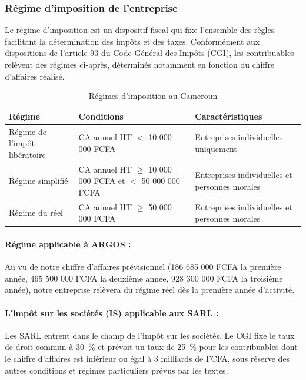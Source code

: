 \subsubsection{Régime d'imposition de l'entreprise}

Le régime d'imposition est un dispositif fiscal qui fixe l'ensemble des règles facilitant la détermination des impôts et des taxes. Conformément aux dispositions de l'article 93 du Code Général des Impôts (CGI), les contribuables relèvent des régimes ci-après, déterminés notamment en fonction du chiffre d'affaires réalisé\cite{cgi_cameroun}.

\begin{table}[htbp]
    \centering
    \caption{Régimes d'imposition au Cameroun}
    \label{tab:regimes_imposition}
    \renewcommand{\arraystretch}{1.5}
    \begin{tabularx}{\textwidth}{|>{\raggedright\arraybackslash}p{4cm}|>{\raggedright\arraybackslash}p{5cm}|X|}
        \hline
        \textbf{Régime} & \textbf{Conditions} & \textbf{Caractéristiques} \\
        \hline
        Régime de l'impôt libératoire & CA annuel HT $<$ 10 000 000 FCFA & Entreprises individuelles uniquement \\
        \hline
        Régime simplifié & CA annuel HT $\geq$ 10 000 000 FCFA et $<$ 50 000 000 FCFA & Entreprises individuelles et personnes morales \\
        \hline
        Régime du réel & CA annuel HT $\geq$ 50 000 000 FCFA & Entreprises individuelles et personnes morales \\
        \hline
    \end{tabularx}
    \tablesourcepromoteurs

\end{table}

\paragraph{Régime applicable à ARGOS :}
Au vu de notre chiffre d'affaires prévisionnel (186 685 000 FCFA la première année, 465 500 000 FCFA la deuxième année, 928 300 000 FCFA la troisième année), notre entreprise relèvera du régime réel dès la première année d'activité\cite{cgi_cameroun}.

\paragraph{L'impôt sur les sociétés (IS) applicable aux SARL :}
Les SARL entrent dans le champ de l'impôt sur les sociétés. Le CGI fixe le taux de droit commun à 30~\% et prévoit un taux de 25~\% pour les contribuables dont le chiffre d'affaires est inférieur ou égal à 3 milliards de FCFA, sous réserve des autres conditions et régimes particuliers prévus par les textes\cite{cgi_cameroun}.

